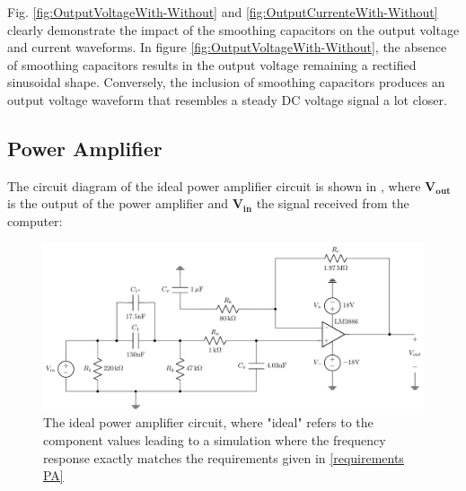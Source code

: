 Fig. \ref{fig:OutputVoltageWith-Without} and \ref{fig:OutputCurrenteWith-Without} clearly demonstrate the impact of the smoothing capacitors on the output voltage and current waveforms. In figure \ref{fig:OutputVoltageWith-Without}, the absence of smoothing capacitors results in the output voltage remaining a rectified sinusoidal shape. Conversely, the inclusion of smoothing capacitors produces an output voltage waveform that resembles a steady DC voltage signal a lot closer. 

\subsection{Power Amplifier}
\label{section: sim PA}
The circuit diagram of the ideal power amplifier circuit is shown in , where $\mathbf{V_{out}}$ is the output of the power amplifier and $\mathbf{V_{in}}$ the signal received from the computer:
\begin{figure}[H]
    \centering
    \includegraphics[width=0.9\linewidth]{TU Delft Booming Bass Project Report/figures/PowerAmplifier/circuits/ideal amplifier.pdf}
    \captionsetup{justification=raggedright, labelfont=bf}
    \caption{The ideal power amplifier circuit, where "ideal" refers to the component values leading to a simulation where the frequency response exactly matches the requirements given in \autoref{requirements PA}}
    \label{fig:ideal amplifier}
\end{figure}

